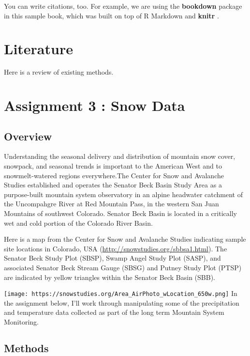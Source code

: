 \documentclass[
]{book}
\begin{document}
You can write citations, too. For example, we are using the \textbf{bookdown} package \citep{R-bookdown} in this sample book, which was built on top of R Markdown and \textbf{knitr} \citep{xie2015}.

\hypertarget{literature}{%
\chapter{Literature}\label{literature}}

Here is a review of existing methods.

\hypertarget{assignment-3-snow-data}{%
\chapter{Assignment 3 : Snow Data}\label{assignment-3-snow-data}}

\hypertarget{overview}{%
\section{Overview}\label{overview}}

Understanding the seasonal delivery and distribution of mountain snow cover, snowpack, and seasonal trends is important to the American West and to snowmelt-watered regions everywhere.The Center for Snow and Avalanche Studies established and operates the Senator Beck Basin Study Area as a purpose-built mountain system observatory in an alpine headwater catchment of the Uncompahgre River at Red Mountain Pass, in the western San Juan Mountains of southwest Colorado. Senator Beck Basin is located in a critically wet and cold portion of the Colorado River Basin.

Here is a map from the Center for Snow and Avalanche Studies indicating sample site locations in Colorado, USA (\url{http://snowstudies.org/sbbsa1.html}). The Senator Beck Study Plot (SBSP), Swamp Angel Study Plot (SASP), and associated Senator Beck Stream Gauge (SBSG) and Putney Study Plot (PTSP) are indicated by yellow triangles within the Senator Beck Basin (SBB).

\texttt{[image: https://snowstudies.org/Area\_AirPhoto\_wLocation\_650w.png]}
In the assignment below, I'll work through manipulating some of the precipitation and temperature data collected as part of the long term Mountain System Monitoring.

\hypertarget{methods}{%
\section{Methods}\label{methods}}
\end{document}
